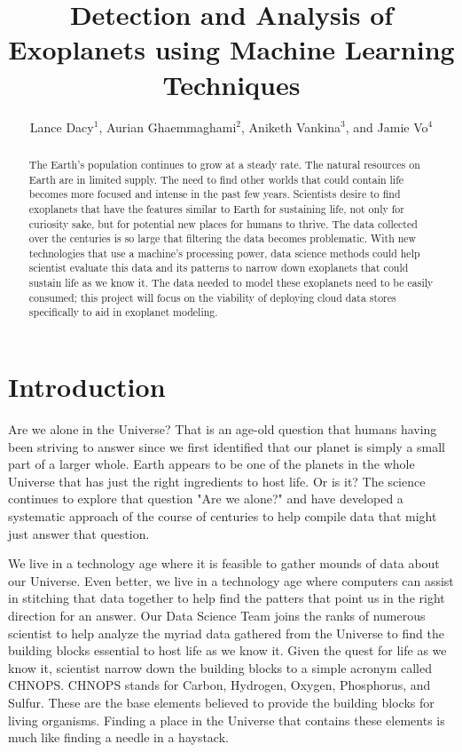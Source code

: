 \documentclass[letterpaper, 10 pt, conference]{ieeeconf}  %
\title{\LARGE \bf
Detection and Analysis of
Exoplanets using Machine Learning
Techniques
}
\author{Lance Dacy$^{1}$, Aurian Ghaemmaghami$^{2}$, Aniketh Vankina$^{3}$, and Jamie Vo$^{4}$%
}
\begin{document}
\maketitle
\thispagestyle{empty}
\pagestyle{empty}


\begin{abstract}

The Earth's population continues to grow at a steady rate. The natural resources on Earth are in limited supply. The need to find other worlds that could contain life becomes more focused and intense in the past few years. Scientists desire to find exoplanets that have the features similar to Earth for sustaining life, not only for curiosity sake, but for potential new places for humans to thrive. The data collected over the centuries is so large that filtering the data becomes problematic. With new technologies that use a machine's processing power, data science methods could help scientist evaluate this data and its patterns to narrow down exoplanets that could sustain life as we know it. The data needed to model these exoplanets need to be easily consumed; this project will focus on the viability of deploying cloud data stores specifically to aid in exoplanet modeling.

\end{abstract}


\section{Introduction}

Are we alone in the Universe? That is an age-old question that humans having been striving to answer since we first identified that our planet is simply a small part of a larger whole. Earth appears to be one of the planets in the whole Universe that has just the right ingredients to host life. Or is it? The science continues to explore that question "Are we alone?" and have developed a systematic approach of the course of centuries to help compile data that might just answer that question. 

We live in a technology age where it is feasible to gather mounds of data about our Universe. Even better, we live in a technology age where computers can assist in stitching that data together to help find the patters that point us in the right direction for an answer. Our Data Science Team joins the ranks of numerous scientist to help analyze the  myriad data gathered from the Universe to find the building blocks essential to host life as we know it. Given the quest for life as we know it, scientist narrow down the building blocks to a simple acronym called CHNOPS. CHNOPS stands for Carbon, Hydrogen, Oxygen, Phosphorus, and Sulfur. These are the base elements believed to provide the building blocks for living organisms. Finding a place in the Universe that contains these elements is much like finding a needle in a haystack.
\end{document}
